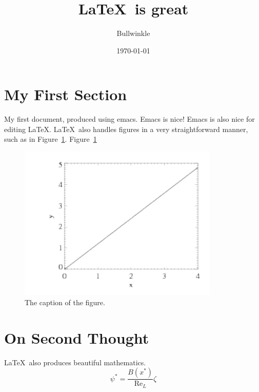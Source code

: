 \documentclass{article}
\begin{document}
\title{\LaTeX\ is great}
\author{Bullwinkle}
\date{\today}
\maketitle

\tableofcontents 
\listoffigures

\section{My First Section}

My first document, produced using emacs.  Emacs is nice!
Emacs is also nice for editing \LaTeX.  \LaTeX\ also handles figures
in a very straightforward manner, such as in Figure~\ref{fig:fig01}. %
Figure~\ref{fig:fig01} %
\begin{figure}[t]
  \begin{center}
  \includegraphics[width=3.75in]{simplefig.pdf}
  \end{center}
  \caption{The caption of the figure.}
\label{fig:fig01}
\end{figure}



\section{On Second Thought}

\LaTeX\ also  produces beautiful mathematics.
\begin{equation}
\psi^\ast = \frac{B(x^\ast)}{\mathrm{Re}_L}\zeta
\end{equation}
\end{document}
